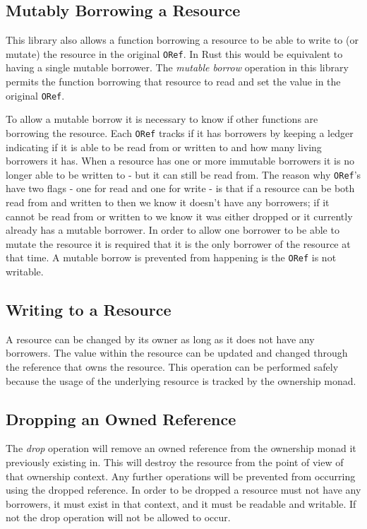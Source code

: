 \documentclass[onehalf,11pt]{beavtex}
\begin{document}
\subsection{Mutably Borrowing a Resource}

This library also allows a function borrowing a resource to be able to
write to (or mutate) the resource in the original \texttt{ORef}.  In Rust this would be
equivalent to having a single mutable borrower.  The \textit{mutable borrow}
operation in this library permits the function borrowing that resource to read
and set the value in the original \texttt{ORef}.

To allow a mutable borrow it is necessary to know if other functions are
borrowing the resource.  Each \texttt{ORef} tracks if it has borrowers by keeping a
ledger indicating if it is able to be read from or written to and how many
living borrowers it has.  When a resource has one or more immutable borrowers it
is no longer able to be written to - but it can still be read from.
The reason why \texttt{ORef}'s have two flags - one for read and one for write - is that
if a resource can be both read from and written to then we know it doesn't have
any borrowers; if it cannot be read from or written to we know it was either
dropped or it currently already has a mutable borrower.
In order to allow one borrower to be able to mutate the resource it is required
that it is the only borrower of the resource at that time. %
A mutable borrow is prevented from happening is the \texttt{ORef} is not writable.


\subsection{Writing to a Resource}

A resource can be changed by its owner as long as it does not have any borrowers.
The value within the resource can be updated and changed through the reference
that owns the resource. This operation can be performed safely because the usage
of the underlying resource is tracked by the ownership monad.

\subsection{Dropping an Owned Reference}

The \textit{drop} operation will remove an owned reference from the
ownership monad it previously existing in. This will destroy the
resource from the point of view of that ownership context. Any further operations
will be prevented from occurring using the dropped reference. In order to be
dropped a resource must not have any borrowers, it must exist in that context,
and it must be readable and writable. If not the drop operation will not be
allowed to occur.
\end{document}
